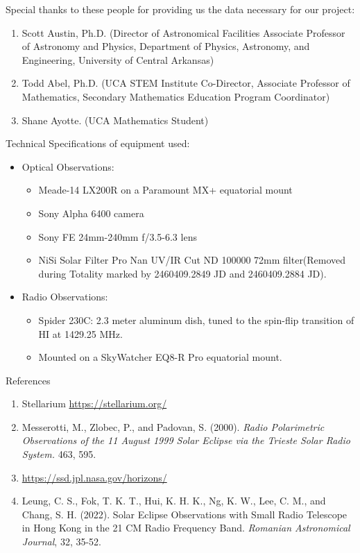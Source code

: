 \noindent Special thanks to these people for providing us the data necessary for our project:

\begin{enumerate}
    \item Scott Austin, Ph.D. (Director of Astronomical Facilities Associate Professor of Astronomy and Physics, Department of Physics, Astronomy, and Engineering, University of Central Arkansas) 
    \item Todd Abel, Ph.D. (UCA STEM Institute Co-Director, Associate Professor of Mathematics, Secondary Mathematics Education Program Coordinator)
    \item Shane Ayotte. (UCA Mathematics Student)
\end{enumerate}

Technical Specifications of equipment used:
\begin{itemize}
    \item Optical Observations:
    \begin{itemize}
        \item Meade-14 LX200R on a Paramount MX+ equatorial mount
        \item Sony Alpha 6400 camera
        \item Sony FE 24mm-240mm f/3.5-6.3 lens
        \item NiSi Solar Filter Pro Nan UV/IR Cut ND 100000 72mm filter(Removed during Totality marked by 2460409.2849 JD and 2460409.2884 JD).
    \end{itemize}
    \item Radio Observations:
    \begin{itemize}
        \item Spider 230C: 2.3 meter aluminum dish, tuned to the spin-flip transition of HI at 1429.25 MHz.
        \item Mounted on a SkyWatcher EQ8-R Pro equatorial mount.
    \end{itemize}
\end{itemize}

References%

\begin{enumerate}
    \item Stellarium \url{https://stellarium.org/}
    \item Messerotti, M., Zlobec, P., and Padovan, S. (2000). \textit{Radio Polarimetric Observations of the 11 August 1999 Solar Eclipse via the Trieste Solar Radio System.} 463, 595.
    \item \url{https://ssd.jpl.nasa.gov/horizons/}
    \item Leung, C. S., Fok, T. K. T., Hui, K. H. K., Ng, K. W., Lee, C. M., and Chang, S. H. (2022). Solar Eclipse Observations with Small Radio Telescope in Hong Kong in the 21 CM Radio Frequency Band. \textit{Romanian Astronomical Journal}, 32, 35-52.
\end{enumerate}